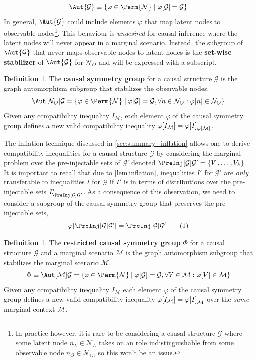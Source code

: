\documentclass[aps, 10pt, english, twoside, pra, nofootinbib, longbibliography]{revtex4-1}
\theoremstyle{plain}
\theoremstyle{definition}
\newtheorem{definition}[theorem]{Definition}
\theoremstyle{remark}
\newcommand{\graph}{\mathcal{G}}
\newcommand{\nodes}{\mathcal{N}}
\newcommand{\gelem}{\varphi}
\newcommand{\action}[1]{\gelem\bs{#1}}
\newcommand{\mscenario}{\mathcal{M}}
\newcommand{\term}[1]{\textcolor{Mahogany}{\textbf{#1}}}
\begin{document}
    \[ \Aut{\graph} \defined \bc{\gelem \in \Perm{\nodes} \mid \action{\graph} = \graph} \]
    In general, $\Aut{\graph}$ could include elements $\gelem$ that map latent nodes to observable nodes\footnote{In practice however, it is rare to be considering a causal structure $\graph$ where some latent node $n_L \in \nodes_L$ takes on an role indistinguishable from some observable node $n_O \in \nodes_O$, so this won't be an issue.}. This behaviour is \textit{undesired} for causal inference where the latent nodes will never appear in a marginal scenario. Instead, the subgroup of $\Aut{\graph}$ that never maps observable nodes to latent nodes is the \term{set-wise stabilizer} of $\Aut{\graph}$ for $\nodes_O$ and will be expressed with a subscript.

    \begin{definition}
        The \term{causal symmetry group} for a causal structure $\graph$ is the graph automorphism subgroup that stabilizes the observable nodes.
        \[ \Aut[\nodes_O]{\graph} = \bc{\gelem \in \Perm{\nodes} \mid \action{\graph} = \graph, \forall n \in \nodes_O :\action{n} \in \nodes_O} \]
        Given any compatibility inequality $I_{\mscenario}$, each element $\gelem$ of the causal symmetry group defines a new valid compatibility inequality $\action{I_{\mscenario}} = \action{I}_{\action{\mscenario}}$.
    \end{definition}

    The inflation technique discussed in \cref{sec:summary_inflation} allows one to derive compatibility inequalities for a causal structure $\graph$ by considering the marginal problem over the pre-injectable sets of $\graph'$ denoted $\PreInj[\graph]{\graph'} = \bc{V_1, \ldots, V_k}$. It is important to recall that due to \cref{lem:inflation}, inequalities $I'$ for $\graph'$ are \textit{only} transferable to inequalities $I$ for $\graph$ if $I'$ is in terms of distributions over the pre-injectable sets $I'_{\PreInj[\graph]{\graph'}}$. As a consequence of this observation, we need to consider a subgroup of the causal symmetry group that preserves the pre-injectable sets,
    \[ \action{\PreInj[\graph]{\graph'}} = \PreInj[\graph]{\graph'} \eq \label{eq:preserved_preinj} \]

    \begin{definition}
        The \term{restricted causal symmetry group} $\Phi$ for a causal structure $\graph$ and a marginal scenario $\mscenario$ is the graph automorphism subgroup that stabilizes the marginal scenario $\mscenario$.
        \[ \Phi \defined \Aut[\mscenario]{\graph} = \bc{\gelem \in \Perm{\nodes} \mid \action{\graph} = \graph, \forall V \in \mscenario : \action{V} \in \mscenario} \]
        Given any compatibility inequality $I_{\mscenario}$ each element $\gelem$ of the causal symmetry group defines a new valid compatibility inequality $\action{I_{\mscenario}} = \action{I}_{\mscenario}$ over the \textit{same} marginal context $\mscenario$.
    \end{definition}
\end{document}
